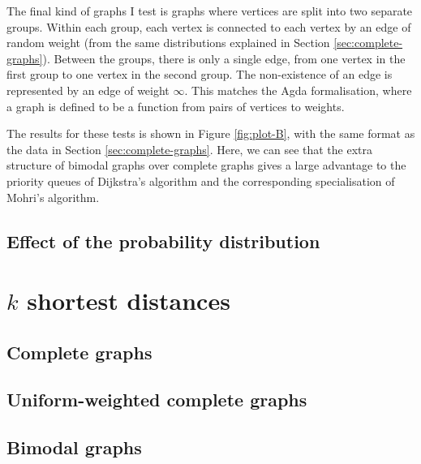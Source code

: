 The final kind of graphs I test is graphs where vertices are split into two separate groups.
Within each group, each vertex is connected to each vertex by an edge of random weight (from the same distributions explained in Section \ref{sec:complete-graphs}).
Between the groups, there is only a single edge, from one vertex in the first group to one vertex in the second group.
The non-existence of an edge is represented by an edge of weight $\infty$.
This matches the Agda formalisation, where a graph is defined to be a function from pairs of vertices to weights.

The results for these tests is shown in Figure \ref{fig:plot-B}, with the same format as the data in Section \ref{sec:complete-graphs}.
Here, we can see that the extra structure of bimodal graphs over complete graphs gives a large advantage to the priority queues of Dijkstra's algorithm and the corresponding specialisation of Mohri's algorithm.


\subsection{Effect of the probability distribution}

\section{$k$ shortest distances}

\subsection{Complete graphs}


\subsection{Uniform-weighted complete graphs}


\subsection{Bimodal graphs}

